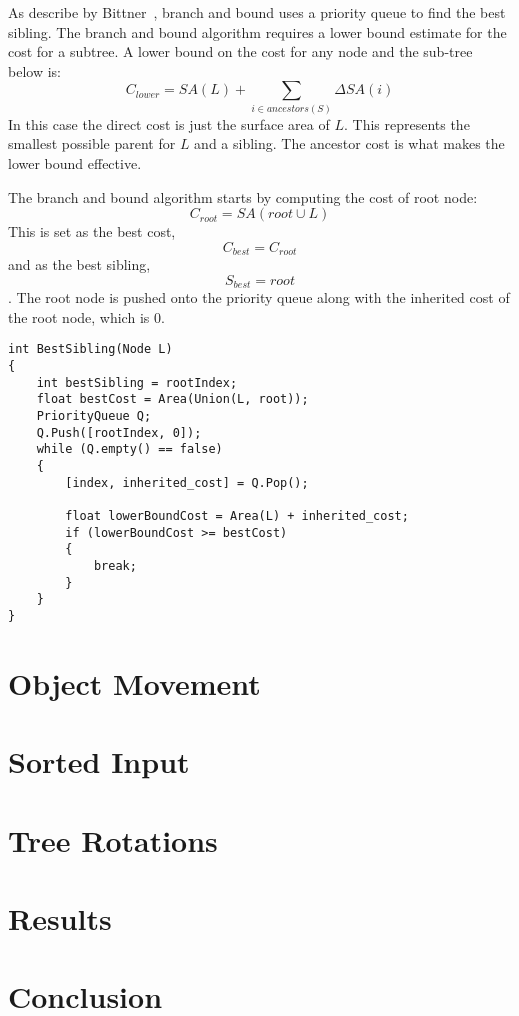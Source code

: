 \documentclass{article}
\begin{document}
As describe by Bittner~\cite{Bittner2013}, branch and bound uses a priority queue to find the best sibling. The branch and bound algorithm requires a lower bound estimate for the cost for a subtree. A lower bound on the cost for any node and the sub-tree below is:
\begin{equation}
C_{lower} = SA(L) + \sum_{i \in ancestors(S)} \Delta SA(i)
\end{equation}
In this case the direct cost is just the surface area of $L$. This represents the smallest possible parent for $L$ and a sibling. The ancestor cost is what makes the lower bound effective.

The branch and bound algorithm starts by computing the cost of root node:
\[ C_{root} = SA(root \cup L) \]
This is set as the best cost, \[C_{best} = C_{root} \] and as the best sibling, \[S_{best} = root\]. The root node is pushed onto the priority queue along with the inherited cost of the root node, which is $0$.
\begin{lstlisting}[caption={Branch and bound sibling search}, label={lst:branch_and_bound}, float]
int BestSibling(Node L)
{
	int bestSibling = rootIndex;
	float bestCost = Area(Union(L, root));
	PriorityQueue Q;
	Q.Push([rootIndex, 0]);
	while (Q.empty() == false)
	{
		[index, inherited_cost] = Q.Pop();

		float lowerBoundCost = Area(L) + inherited_cost;
		if (lowerBoundCost >= bestCost)
		{
			break;
		}
	}
}	
\end{lstlisting}
\section{Object Movement}

\section{Sorted Input}

\section{Tree Rotations}

\section{Results}

\section{Conclusion}
\end{document}
